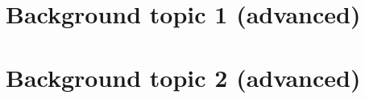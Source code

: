 \blindtext

\section{Background topic 1 (advanced)}\label{sec:background-2::topic-1}

\section{Background topic 2 (advanced)}\label{sec:background-2::topic-2}

